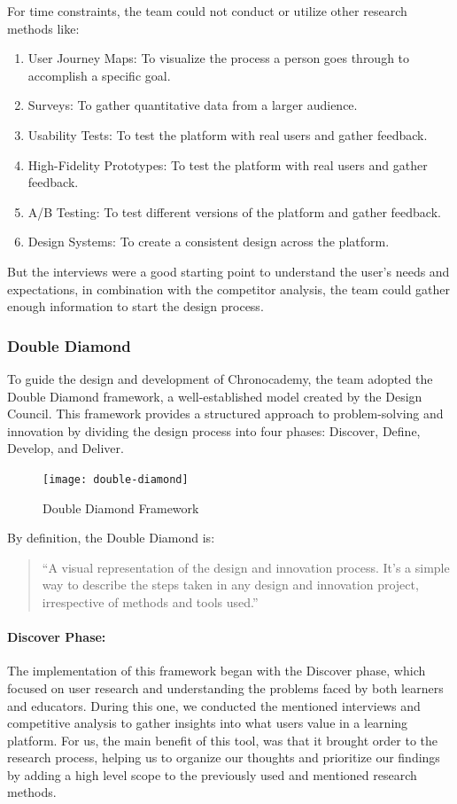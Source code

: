 \noindent For time constraints, the team could not conduct or utilize other research methods like:\newline
\begin{enumerate}
    \item User Journey Maps: To visualize the process a person goes through to accomplish a specific goal.
    \item Surveys: To gather quantitative data from a larger audience.
    \item Usability Tests: To test the platform with real users and gather feedback.
    \item High-Fidelity Prototypes: To test the platform with real users and gather feedback.
    \item A/B Testing: To test different versions of the platform and gather feedback.
    \item Design Systems: To create a consistent design across the platform.
\end{enumerate}

But the interviews were a good starting point to understand the user's needs and expectations, in combination with the competitor analysis, the team could gather enough information to start the design process.

\subsubsection{Double Diamond}\label{subsubsec:double-diamond}
To guide the design and development of Chronocademy, the team adopted the Double Diamond framework, a well-established model created by the Design Council.
This framework provides a structured approach to problem-solving and innovation by dividing the design process into four phases: Discover, Define, Develop, and Deliver.

\begin{figure}[h]
    \centering
    \texttt{[image: double-diamond]}
    \caption{Double Diamond Framework}
    \label{fig:figure12}
\end{figure}
By definition, the Double Diamond is:
\begin{quote}
    ``A visual representation of the design and innovation process.
    It’s a simple way to describe the steps taken in any design and innovation project, irrespective of methods and tools used.''~\cite[Double Diamond]{doubleDiamond}
\end{quote}

\paragraph{Discover Phase:}
The implementation of this framework began with the Discover phase, which focused on user research and understanding the problems faced by both learners and educators.
During this one, we conducted the mentioned interviews and competitive analysis to gather insights into what users value in a learning platform.
For us, the main benefit of this tool, was that it brought order to the research process, helping us to organize our thoughts and prioritize our findings by adding a high level scope to the previously used and mentioned research methods.\newline

